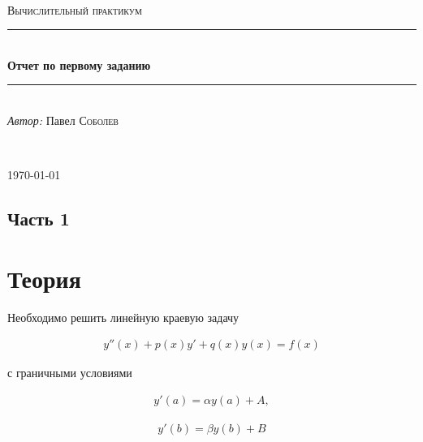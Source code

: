 

\usepackage{graphicx}



\begin{titlepage}

    \newcommand{\HRule}{\rule{\linewidth}{0.5mm}}

    \center

    \ \\[6.5cm]

    \textsc{\Large Вычислительный практикум}\\[0.5cm]

    \HRule\\[0.4cm]

    {\huge\bfseries Отчет по первому заданию}\\[0.4cm]

    \HRule\\[0.5cm]

    \large
    \textit{Автор:} Павел \textsc{Соболев}

    \ \\[0.9cm]
    \vfill\vfill\vfill

    {\large\today}

    \vfill

\end{titlepage}

\subsection*{Часть 1}
\section*{Теория}

\vspace{18pt}

Необходимо решить линейную краевую задачу

\hs
\begin{gather}
    y''(x) + p(x) y' + q(x) y(x) = f(x)
\end{gather}

с граничными условиями

\hs
\begin{gather}
    y'(a) = \alpha y(a) + A,
\end{gather}

\begin{gather}
    y'(b) = \beta y(b) + B
\end{gather}

